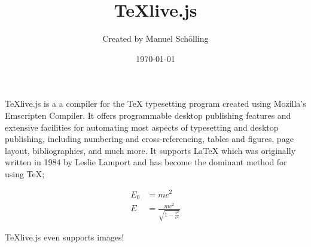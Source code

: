 \documentclass[12pt]{article}
\title{\TeX live.js}
\author{Created by Manuel Sch\"olling}
\date{\today}
\begin{document}
  \maketitle
  \TeX{}live.js is a a compiler for the \TeX{}
  typesetting program created using Mozilla's Emscripten
  Compiler. It offers programmable desktop
  publishing features and extensive facilities for
  automating most aspects of typesetting and desktop
  publishing, including numbering and cross-referencing,
  tables and figures, page layout, bibliographies, and
  much more. It supports \LaTeX{} which was originally written 
  in 1984 by Leslie Lamport and has become the dominant method for
  using \TeX;
 
  \begin{align}
    E_0 &= mc^2                              \\
    E &= \frac{mc^2}{\sqrt{1-\frac{v^2}{c^2}}}
  \end{align}


  \TeX{}live.js even supports images!
\end{document}

